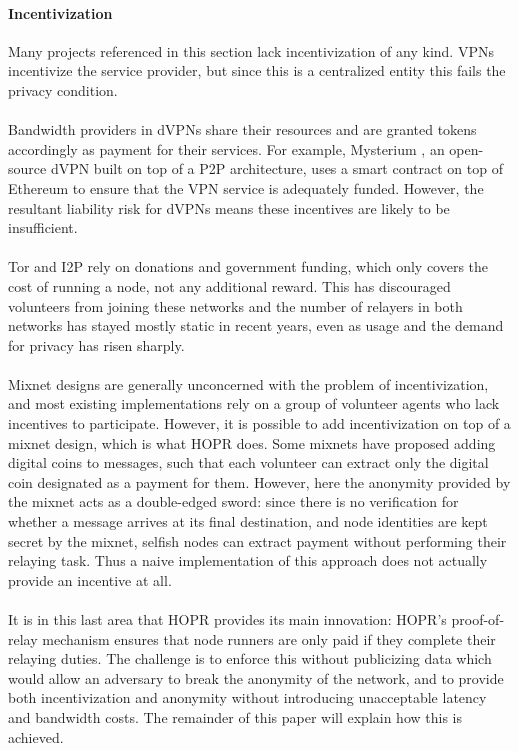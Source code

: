 \paragraph{Incentivization} Many projects referenced in this section lack incentivization of any kind. VPNs incentivize the service provider, but since this is a centralized entity this fails the privacy condition. 
\\~\\Bandwidth providers in dVPNs share their resources and are granted tokens accordingly as payment for their
services. For example, Mysterium \cite{mysterium}, an open-source dVPN built on top of a P2P architecture, uses a smart contract on top of Ethereum to ensure
that the VPN service is adequately funded. However, the resultant liability risk for dVPNs means these incentives are likely to be insufficient. 
\\~\\Tor and I2P rely on donations and government funding, which only covers the cost of running a node, not any additional reward. This has discouraged volunteers from joining these networks and the number of relayers in both networks has stayed mostly static in recent years, even as usage and the demand for privacy has risen sharply.
\\~\\Mixnet designs are generally unconcerned with the problem of incentivization, and most existing implementations rely on a group of volunteer agents who lack incentives to participate. However, it is possible to add incentivization on top of a mixnet design, which is what HOPR does. Some mixnets have proposed adding digital coins to messages, such that each volunteer can extract only the digital coin designated as a payment for them. However, here the anonymity provided by the mixnet acts as a double-edged sword: since there is no verification for whether a message arrives at its final destination, and node identities are kept secret by the mixnet, selfish nodes can extract payment without performing their relaying task. Thus a naive implementation of this approach does not actually provide an incentive at all.
\\~\\It is in this last area that HOPR provides its main innovation: HOPR's proof-of-relay mechanism ensures that node runners are only paid if they complete their relaying duties. The challenge is to enforce this without publicizing data which would allow an adversary to break the anonymity of the network, and to provide both incentivization and anonymity without introducing unacceptable latency and bandwidth costs. The remainder of this paper will explain how this is achieved. 

